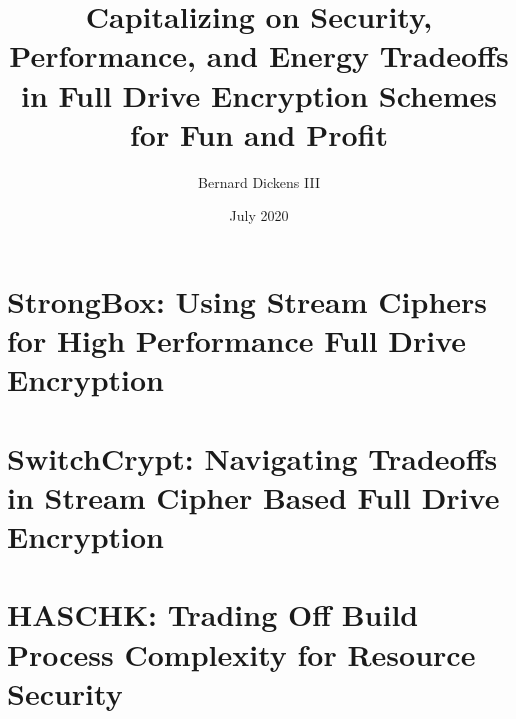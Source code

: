 \documentclass{ucetd}
\title{Capitalizing on Security, Performance, and Energy Tradeoffs in Full Drive Encryption Schemes for Fun and Profit}
\author{Bernard Dickens III}
\date{July 2020}
\begin{document}
\maketitle

\makecopyright
\makededication

\tableofcontents
\listoffigures
\listoftables




\mainmatter




\chapter{StrongBox: Using Stream Ciphers for High Performance Full Drive Encryption} \label{chp:strongbox}






\chapter{SwitchCrypt: Navigating Tradeoffs in Stream Cipher Based Full Drive Encryption} \label{chp:switchcrypt}







\chapter{HASCHK: Trading Off Build Process Complexity for Resource Security}
\label{chp:haschk}









\clearpage
{}
\begin{singlespace}
    \printbibliography
\end{singlespace}

%
%
\end{document}
